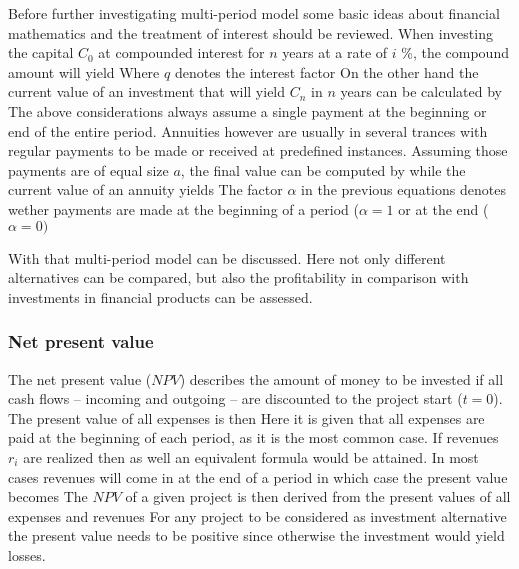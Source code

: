     Before further investigating multi-period model some basic ideas about financial mathematics
    and the treatment of interest should be reviewed. When investing the capital $C_0$ at compounded
    interest for $n$ years at a rate of $i$ \%, the compound amount will yield
    Where $q$ denotes the interest factor
    On the other hand the current value of an investment that will yield $C_n$ in $n$ years can be calculated
    by
    The above considerations always assume a single payment at the beginning or end of the entire period.
    Annuities however are usually in several trances with regular payments to be made or received at
    predefined instances. Assuming those payments are of equal size $a$, the final value can be computed by
    while the current value of an annuity yields
    The factor $\alpha$ in the previous equations denotes wether payments are made at the beginning
    of a period ($\alpha = 1$ or at the end ($\alpha = 0)$

    With that multi-period model can be discussed. Here not only different alternatives can be compared,
    but also the profitability in comparison with investments in financial products can be assessed.

\subsubsection{Net present value}
The net present value ($NPV$) describes the amount of money to be invested if all cash flows --
incoming and outgoing -- are discounted to the project start ($t = 0$). The present value of
all expenses is then
%
Here it is given that all expenses are paid at the beginning of each period, as it is the most common case.
If revenues $r_i$ are realized then as well an equivalent formula would be attained. In most cases
revenues will come in at the end of a period in which case the present value becomes
%
The $NPV$ of a given project is then derived from the present values of all expenses and revenues
%
For any project to be considered as investment alternative the present value needs to be positive since
otherwise the investment would yield losses.

